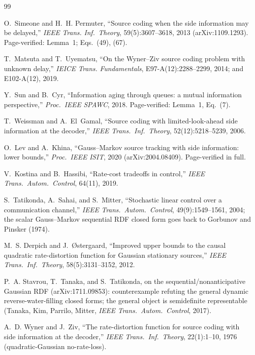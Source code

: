 ﻿\documentclass[11pt]{article}
\theoremstyle{remark}
\begin{document}
\begin{thebibliography}{99}\small

 O.~Simeone and H.~H. Permuter, ``Source
coding when the side information may be delayed,'' \emph{IEEE Trans.
Inf.\ Theory}, 59(5):3607--3618, 2013 (arXiv:1109.1293). Page-verified:
Lemma~1; Eqs.~(49), (67).

 T.~Matsuta and T.~Uyematsu, ``On the Wyner--Ziv
source coding problem with unknown delay,'' \emph{IEICE Trans.
Fundamentals}, E97-A(12):2288--2299, 2014; and E102-A(12), 2019.

 Y.~Sun and B.~Cyr, ``Information aging through
queues: a mutual information perspective,'' \emph{Proc.\ IEEE SPAWC},
2018. Page-verified: Lemma~1, Eq.~(7).

 T.~Weissman and A.~El~Gamal, ``Source coding with
limited-look-ahead side information at the decoder,'' \emph{IEEE
Trans.\ Inf.\ Theory}, 52(12):5218--5239, 2006.

 O.~Lev and A.~Khina, ``Gauss--Markov source
tracking with side information: lower bounds,'' \emph{Proc.\ IEEE
ISIT}, 2020 (arXiv:2004.08409). Page-verified in full.

 V.~Kostina and B.~Hassibi, ``Rate-cost tradeoffs in
control,'' \emph{IEEE Trans.\ Autom.\ Control}, 64(11), 2019.

 S.~Tatikonda, A.~Sahai, and S.~Mitter,
``Stochastic linear control over a communication channel,'' \emph{IEEE
Trans.\ Autom.\ Control}, 49(9):1549--1561, 2004; the scalar
Gauss--Markov sequential RDF closed form goes back to Gorbunov and
Pinsker (1974).

 M.~S. Derpich and J.~{\O}stergaard, ``Improved upper
bounds to the causal quadratic rate-distortion function for Gaussian
stationary sources,'' \emph{IEEE Trans.\ Inf.\ Theory},
58(5):3131--3152, 2012.

 P.~A. Stavrou, T.~Tanaka, and S.~Tatikonda, on the
sequential/nonanticipative Gaussian RDF (arXiv:1711.09853):
counterexample refuting the general dynamic reverse-water-filling
closed forms; the general object is semidefinite representable (Tanaka,
Kim, Parrilo, Mitter, \emph{IEEE Trans.\ Autom.\ Control}, 2017).

 A.~D. Wyner and J.~Ziv, ``The rate-distortion
function for source coding with side information at the decoder,''
\emph{IEEE Trans.\ Inf.\ Theory}, 22(1):1--10, 1976 (quadratic-Gaussian
no-rate-loss).


\end{thebibliography}
\end{document}
